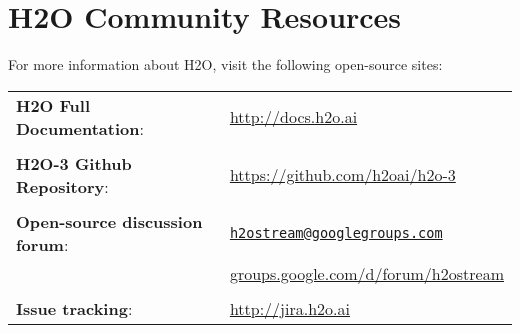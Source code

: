 \section{H2O Community Resources}
\begin{singlespacing}

For more information about H2O, visit the following open-source sites:

\begin{tabular}{l l}
{\textbf{H2O Full Documentation}}: & \url{http://docs.h2o.ai} \\
\\
{\textbf{H2O-3 Github Repository}}: & \url{https://github.com/h2oai/h2o-3} \\
\\
{\textbf{Open-source discussion forum}}: & \href{mailto:h2ostream@googlegroups.com}{\texttt{h2ostream@googlegroups.com}} \\
& {\small{\url{groups.google.com/d/forum/h2ostream}}} \\
\\
{\textbf{Issue tracking}}: & \url{http://jira.h2o.ai}
\end{tabular}

\end{singlespacing}
\bigskip

